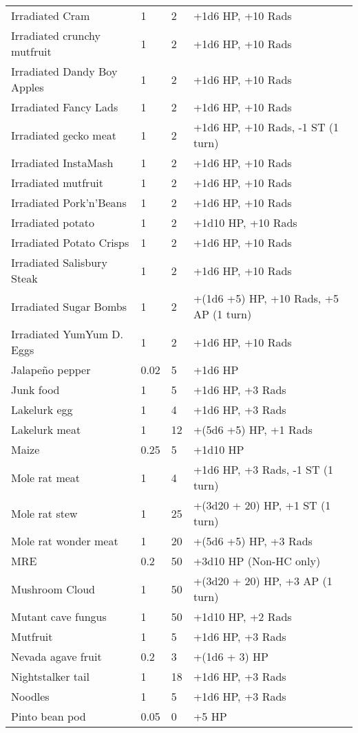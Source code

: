 \begin{longtable}{|p{4cm}|p{1.5cm}|p{1.5cm}|p{9cm}|}
Irradiated Cram & 1 & 2 & +1d6 HP, +10 Rads \\
Irradiated crunchy mutfruit & 1 & 2 & +1d6 HP, +10 Rads \\
Irradiated Dandy Boy Apples & 1 & 2 & +1d6 HP, +10 Rads \\
Irradiated Fancy Lads & 1 & 2 & +1d6 HP, +10 Rads \\
Irradiated gecko meat & 1 & 2 & +1d6 HP, +10 Rads, -1 ST (1 turn) \\
Irradiated InstaMash & 1 & 2 & +1d6 HP, +10 Rads \\
Irradiated mutfruit & 1 & 2 & +1d6 HP, +10 Rads \\
Irradiated Pork'n'Beans & 1 & 2 & +1d6 HP, +10 Rads \\
Irradiated potato & 1 & 2 & +1d10 HP, +10 Rads \\
Irradiated Potato Crisps & 1 & 2 & +1d6 HP, +10 Rads \\
Irradiated Salisbury Steak & 1 & 2 & +1d6 HP, +10 Rads \\
Irradiated Sugar Bombs & 1 & 2 & +(1d6 +5) HP, +10 Rads, +5 AP (1 turn) \\
Irradiated YumYum D. Eggs & 1 & 2 & +1d6 HP, +10 Rads \\
Jalapeño pepper & 0.02 & 5 & +1d6 HP \\
Junk food & 1 & 5 & +1d6 HP, +3 Rads \\
Lakelurk egg & 1 & 4 & +1d6 HP, +3 Rads \\
Lakelurk meat & 1 & 12 & +(5d6 +5) HP, +1 Rads \\
Maize & 0.25 & 5 & +1d10 HP \\
Mole rat meat & 1 & 4 & +1d6 HP, +3 Rads, -1 ST (1 turn) \\
Mole rat stew & 1 & 25 & +(3d20 + 20) HP, +1 ST (1 turn) \\
Mole rat wonder meat & 1 & 20 & +(5d6 +5) HP, +3 Rads \\
MRE & 0.2 & 50 & +3d10 HP (Non-HC only) \\
Mushroom Cloud & 1 & 50 & +(3d20 + 20) HP, +3 AP (1 turn) \\
Mutant cave fungus & 1 & 50 & +1d10 HP, +2 Rads \\
Mutfruit & 1 & 5 & +1d6 HP, +3 Rads \\
Nevada agave fruit & 0.2 & 3 & +(1d6 + 3) HP \\
Nightstalker tail & 1 & 18 & +1d6 HP, +3 Rads \\
Noodles & 1 & 5 & +1d6 HP, +3 Rads \\
Pinto bean pod & 0.05 & 0 & +5 HP \\

\end{longtable}
